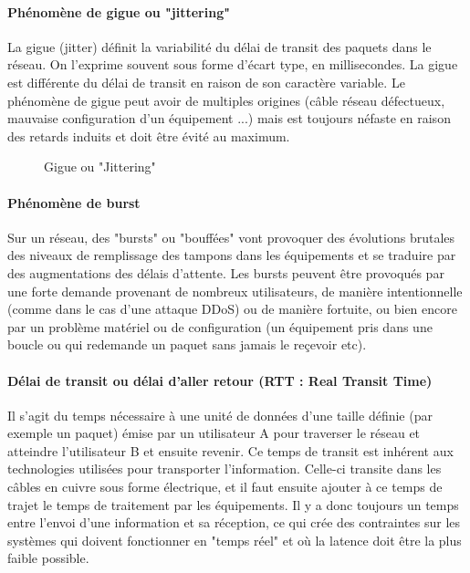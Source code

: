 \documentclass[french]{article}
\begin{document}
\paragraph{Phénomène de gigue ou "jittering"}

La gigue (jitter) définit la variabilité du délai de transit des paquets dans le réseau. On l'exprime souvent sous forme d'écart type, en millisecondes.
La gigue est différente du délai de transit en raison de son caractère variable. Le phénomène de gigue peut avoir de multiples origines (câble réseau défectueux, mauvaise configuration d'un équipement ...) mais est toujours néfaste en raison des retards induits et doit être évité au maximum.

\begin{figure}[h]
	\caption{Gigue ou "Jittering"}
	\label{fig:gigue_jittering}
\end{figure} 

\paragraph{Phénomène de burst}

Sur un réseau, des "bursts" ou "bouffées" vont provoquer des évolutions brutales des niveaux de remplissage des tampons dans les équipements et se traduire par des augmentations des délais d'attente.
Les bursts peuvent être provoqués par une forte demande provenant de nombreux utilisateurs, de manière intentionnelle (comme dans le cas d'une attaque DDoS) ou de manière fortuite, ou bien encore par un problème matériel ou de configuration (un équipement pris dans une boucle ou qui redemande un paquet sans jamais le reçevoir etc).

\paragraph{Délai de transit ou délai d'aller retour (RTT : Real Transit Time)}

Il s'agit du temps nécessaire à une unité de données d'une taille définie (par exemple un paquet) émise par un utilisateur A pour traverser le réseau et atteindre l'utilisateur B et ensuite revenir.
Ce temps de transit est inhérent aux technologies utilisées pour transporter l'information. Celle-ci transite dans les câbles en cuivre sous forme électrique, et il faut ensuite ajouter à ce temps de trajet le temps de traitement par les équipements. Il y a donc toujours un temps entre l'envoi d'une information et sa réception, ce qui crée des contraintes sur les systèmes qui doivent fonctionner en "temps réel" et où la latence doit être la plus faible possible.
\end{document}
